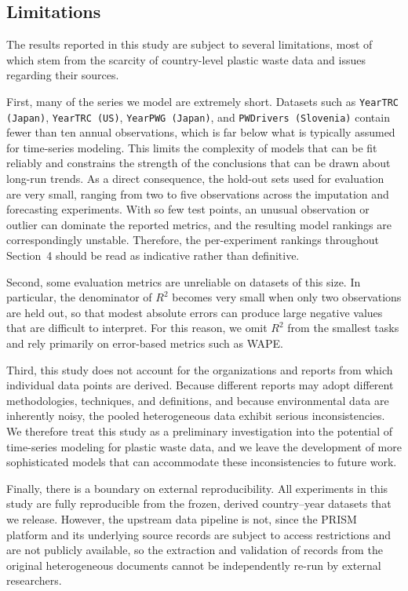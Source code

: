 \subsection{Limitations}

The results reported in this study are subject to several limitations, most of which stem from the scarcity of country-level plastic waste data and issues regarding their sources.

First, many of the series we model are extremely short. Datasets such as \texttt{YearTRC (Japan)}, \texttt{YearTRC (US)}, \texttt{YearPWG (Japan)}, and \texttt{PWDrivers (Slovenia)} contain fewer than ten annual observations, which is far below what is typically assumed for time-series modeling. This limits the complexity of models that can be fit reliably and constrains the strength of the conclusions that can be drawn about long-run trends. As a direct consequence, the hold-out sets used for evaluation are very small, ranging from two to five observations across the imputation and forecasting experiments. With so few test points, an unusual observation or outlier can dominate the reported metrics, and the resulting model rankings are correspondingly unstable. Therefore, the per-experiment rankings throughout Section~4 should be read as indicative rather than definitive.

Second, some evaluation metrics are unreliable on datasets of this size. In particular, the denominator of \(R^2\) becomes very small when only two observations are held out, so that modest absolute errors can produce large negative values that are difficult to interpret. For this reason, we omit \(R^2\) from the smallest tasks and rely primarily on error-based metrics such as WAPE.

Third, this study does not account for the organizations and reports from which individual data points are derived. Because different reports may adopt different methodologies, techniques, and definitions, and because environmental data are inherently noisy, the pooled heterogeneous data exhibit serious inconsistencies. We therefore treat this study as a preliminary investigation into the potential of time-series modeling for plastic waste data, and we leave the development of more sophisticated models that can accommodate these inconsistencies to future work.

Finally, there is a boundary on external reproducibility. All experiments in this study are fully reproducible from the frozen, derived country--year datasets that we release. However, the upstream data pipeline is not, since the PRISM platform and its underlying source records are subject to access restrictions and are not publicly available, so the extraction and validation of records from the original heterogeneous documents cannot be independently re-run by external researchers.
